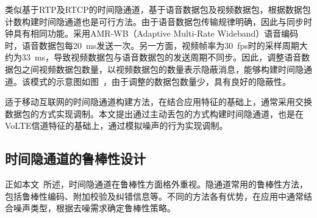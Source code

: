 类似基于RTP及RTCP的时间隐通道，基于语音数据包及视频数据包，根据数据包计数构建时间隐通道也是可行方法。由于语音数据包传输规律明确，因此与同步时钟具有相同功能。采用{AMR-WB（Adaptive Multi-Rate Wideband）}语音编码时，语音数据包每{20\ ms}发送一次。另一方面，视频帧率为{30\ fps}时的采样周期大约为{33\ ms}，导致视频数据包与语音数据包的发送周期不同步。因此，调整语音数据包之间视频数据包数量，以视频数据包的数量表示隐蔽消息，能够构建时间隐通道。该模式的示意图如图\ ，由于调整的数据包数量少，具有良好的隐蔽性。

适于移动互联网的时间隐通道构建方法，在结合应用特征的基础上，通常采用交换数据包的方式实现调制。本文提出通过主动丢包的方式构建时间隐通道，也是在VoLTE信道特征的基础上，通过模拟噪声的行为实现调制。

\subsection{时间隐通道的鲁棒性设计}
\label{chap:backinfo:ctc:robustness}
正如本文\ 所述，时间隐通道在鲁棒性方面格外重视。隐通道常用的鲁棒性方法，包括鲁棒性编码、附加校验及纠错信息等。不同的方法各有优势，在应用中通常结合噪声类型，根据去噪需求确定鲁棒性策略。



